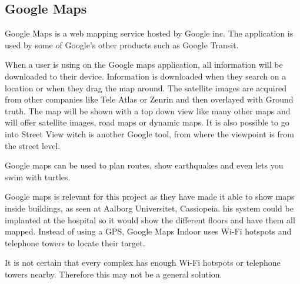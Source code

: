 
\subsection{Google Maps}
Google Maps is a web mapping service hosted by Google inc. The application is used by some of Google's other products such as Google Transit\cite{Goo_transist}. 

When a user is using on the Google maps application, all information will be downloaded to their device. Information is downloaded when they search on a location or when they drag the map around\cite{Goo_input}. The satellite images are acquired from other companies like Tele Atlas\cite{Goo_Tele} or Zenrin\cite{Goo_Zenrin} and then overlayed with Ground truth\cite{Goo_GT}.
The map will be shown with a top down view like many other maps and will offer satellite images, road maps or dynamic maps. It is also possible to go into Street View witch is another Google tool, from where the viewpoint is from the street level\cite{Goo_street}.

Google maps can be used to plan routes, show earthquakes and even lets you swim with turtles\cite{Goo_Turtle}.

Google maps is relevant for this project as they have made it able to show maps inside buildings, as seen at Aalborg Universitet, Cassiopeia\cite{Goo_Indoor}. his system could be implanted at the hospital so it would show the different floors and have them all mapped. Instead of using a GPS, Google Maps Indoor uses Wi-Fi hotspots and telephone towers to locate their target\cite{Goo_Indoor}.

It is not certain that every complex has enough Wi-Fi hotspots or telephone towers nearby. Therefore this may not be a general solution.